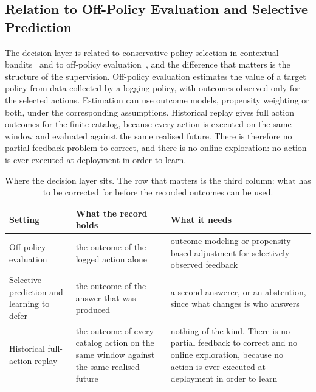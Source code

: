\documentclass{article}
\begin{document}
\subsection{Relation to Off-Policy Evaluation and Selective Prediction}
\label{app:ope-positioning}
The decision layer is related to conservative policy selection in contextual
bandits~\citep{abbasiyadkori2011improved,lattimore2020bandit} and to off-policy
evaluation~\citep{strehl2010learning,dudik2011doubly,swaminathan2015counterfactual,
jiang2016doubly,thomas2016data}, and the difference that matters is the structure of the
supervision. Off-policy evaluation estimates the value of a target policy from data collected
by a logging policy, with outcomes observed only for the selected actions. Estimation can
use outcome models, propensity weighting or both, under the corresponding assumptions. Historical replay gives full action outcomes for the finite catalog,
because every action is executed on the same window and evaluated against the same realised
future. There is therefore no partial-feedback problem to correct, and there is no online
exploration: no action is ever executed at deployment in order to learn.

\begin{table}[htbp]
  \caption{Where the decision layer sits. The row that matters is the third column: what has to
  be corrected for before the recorded outcomes can be used.}
  \label{tab:app-positioning}
  \centering
  \small
  \setlength{\tabcolsep}{4pt}
\begin{tabular}{@{}p{} p{} p{}@{}}
    \toprule
    Setting & What the record holds & What it needs \\
    \midrule
    Off-policy evaluation & the outcome of the logged action alone & outcome modeling or propensity-based adjustment for selectively observed feedback \\
    Selective prediction and learning to defer & the outcome of the answer that was produced & a second answerer, or an abstention, since what changes is who answers \\
    Historical full-action replay & the outcome of every catalog action on the same window against the same realised future & nothing of the kind. There is no partial feedback to correct and no online exploration, because no action is ever executed at deployment in order to learn \\
    \bottomrule
  \end{tabular}
\end{table}
\end{document}
